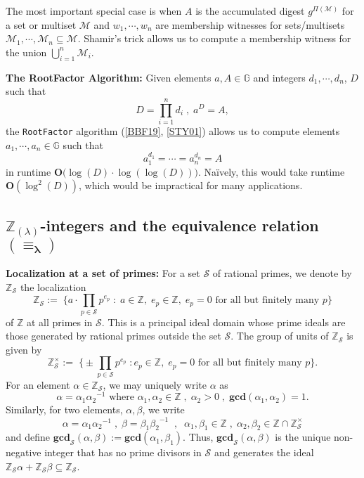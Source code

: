 \documentclass[11pt, lettersize, notitlepage, leqno, footskip=0.6cm]{article}
\newcommand{\bz}{\mathbb Z}
\newcommand{\pl}{\prod\limits}
\newcommand{\slim}{\sum\limits}
\newcommand{\bG}{\mathbb{G}}
\newcommand{\mc}{\mathcal}
\newcommand{\mb}{\mathbb}
\newcommand{\mbf}{\mathbf}
\newcommand{\al}{\alpha}
\newcommand{\be}{\beta}
\newcommand{\lam}{\lambda}
\newcommand{\lamb}{\lambda}
\newcommand{\bzs}{\bz_{\mc{S}}}
\newcommand{\sub}{\subseteq}
\newcommand{\vs}{\vspace{-0.15cm}}
\newcommand{\noin}{\noindent}
\newcommand{\op}{overwhelming probability}
\newcommand{\LCM}{\mbf{lcm}}
\newcommand{\GCD}{\mbf{gcd}}
\numberwithin{equation}{section}
\begin{document}
The most important special case is when $A$ is the accumulated digest $g^{\Pi(\mc{M})}$ for a set or multiset $\mc{M}$ and $w_1,\cdots,w_n$ are membership witnesses for sets/multisets $\mc{M}_1,\cdots,\mc{M}_n\sub \mc{M}$. Shamir's trick allows us to compute a membership witness for the union $\bigcup\limits_{i=1}^n \mc{M}_i$. 

\begin{comment} Conversely, for any element $b = \pl_{i=1}^n a_i^{x_i}$ $(x_i\in\bz)$, we have \vs $$ b^{\LCM(d_1,\cdots,d_n)} = A^{\slim_{i=1}^n  \frac{\LCM(d_1,\cdots,d_n)x_i}{d_i}} $$ and the low order assumption implies that with \op, \vs $$b =  a^{\slim_{i=1}^n  \frac{\LCM(d_1,\cdots,d_n)x_i}{d_i}}.$$ Thus, $b$ is expressible as a power of $a$. 

\end{comment}

\vspace{0.2cm}


\noindent \textbf{The RootFactor Algorithm:} Given elements $a, A\in\mb{G}$ and integers $d_1,\cdots, d_n$, $D$ such that \vs $$D= \pl_{i=1}^n d_i\; ,\; a^{D} = A,$$ the {\tt{RootFactor}} algorithm (\hyperlink{BBF19}{[BBF19]}, \hyperlink{STY01}{[STY01]}) allows us to compute elements $a_1,\cdots, a_n\in \bG$ such that \vs $$a_1^{d_1}=\cdots = a_n^{d_n} = A$$ in runtime $\mbf{O}\big(\log(D)\cdot \log(\log(D))\big)$. Na\"ively, this would take runtime $\mbf{O}(\log^2(D))$, which would be impractical for many applications.


\subsection{\fontsize{11}{11}\selectfont $\bz_{(\lamb)}$-integers and the equivalence relation $\mathbf{(\equiv_{\lam})}$}





\noin \textbf{Localization at a set of primes:} For a set $\mc{S}$ of rational primes, we denote by $\bz_{\mc{S}}$ the localization \vs $$\bz_{\mc{S}}:= \;\Big\{a\cdot\pl_{p\in \mc{S}} p^{e_p}\;:\;a\in\bz,\; e_p\in \bz,\;e_p = 0 \text{ for all but finitely many } p\Big\} $$ of $\bz$ at all primes in $\mc{S}$. This is a principal ideal domain whose prime ideals are those generated by rational primes outside the set $\mc{S}$. The group of units of $\bzs$ is given by \vs $$\bzs^{\times}:= \;\Big\{\pm {\pl_{p\in \mc{S}} p^{e_p}}\;: e_p\in \bz,\;e_p = 0 \text{ for all but finitely many } p\Big\} .$$ For an element $\al\in \bz_{\mc{S}}$, we may uniquely write $\al$ as \vs $$\al = {\al_1}{\al_2}^{-1} \text{ where } \al_1,\al_2\in \bz\;,\; \al_2>0\;,\;\GCD(\al_1,\al_2) = 1.$$ 
Similarly, for two elements, $\al,\be$, we write \vs $$\al = \al_1{\al_2}^{-1}\;,\; \be = {\be_1}{\be_2}^{-1}\;\;,\;\;\al_1,\be_1\in\bz\;,\;\al_2,\be_2\in \bz\cap\bzs^{\times}$$ and define $\GCD_{\mc{S}}(\al,\be):= \GCD(\al_1,\be_1)$. Thus, $\GCD_{\mc{S}}(\al,\be)$ is the unique non-negative integer that has no prime divisors in $\mc{S}$ and generates the ideal $\bzs \al+\bzs\be\sub \bzs$.\vspace{0.1cm}
\end{document}
